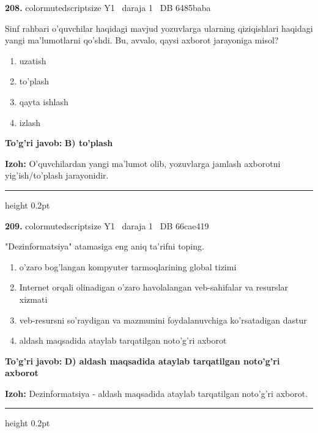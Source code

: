 \documentclass[10pt,a4paper,oneside]{article}
\begin{document}
\noindent\textbf{\color{ink}208.}  {color{muted}scriptsize Y1 \textbullet\ daraja 1 \textbullet\ DB 6485baba}
\par
Sinf rahbari o'quvchilar haqidagi mavjud yozuvlarga ularning qiziqishlari haqidagi yangi ma'lumotlarni qo'shdi. Bu, avvalo, qaysi axborot jarayoniga misol?
\begin{enumerate}[label=\Alph*),leftmargin=9mm]
\item uzatish
\item to'plash
\item qayta ishlash
\item izlash
\end{enumerate}
\begin{tcolorbox}[enhanced,breakable,colback=teal!4,colframe=teal!50!black,boxrule=0.5pt,arc=1.1mm,left=3mm,right=3mm,top=1.7mm,bottom=1.7mm,before skip=2mm,after skip=2mm]
\textbf{\color{teal}To'g'ri javob:} \textbf{B) to'plash}
\par\smallskip
\textbf{Izoh:} O'quvchilardan yangi ma'lumot olib, yozuvlarga jamlash axborotni yig'ish/to'plash jarayonidir.
\end{tcolorbox}
\vspace{2mm}\hrule height 0.2pt \vspace{3mm}

\noindent\textbf{\color{ink}209.}  {color{muted}scriptsize Y1 \textbullet\ daraja 1 \textbullet\ DB 66cae419}
\par
"Dezinformatsiya" atamasiga eng aniq ta'rifni toping.
\begin{enumerate}[label=\Alph*),leftmargin=9mm]
\item o'zaro bog'langan kompyuter tarmoqlarining global tizimi
\item Internet orqali olinadigan o'zaro havolalangan veb-sahifalar va resurslar xizmati
\item veb-resursni so'raydigan va mazmunini foydalanuvchiga ko'rsatadigan dastur
\item aldash maqsadida ataylab tarqatilgan noto'g'ri axborot
\end{enumerate}
\begin{tcolorbox}[enhanced,breakable,colback=teal!4,colframe=teal!50!black,boxrule=0.5pt,arc=1.1mm,left=3mm,right=3mm,top=1.7mm,bottom=1.7mm,before skip=2mm,after skip=2mm]
\textbf{\color{teal}To'g'ri javob:} \textbf{D) aldash maqsadida ataylab tarqatilgan noto'g'ri axborot}
\par\smallskip
\textbf{Izoh:} Dezinformatsiya - aldash maqsadida ataylab tarqatilgan noto'g'ri axborot.
\end{tcolorbox}
\vspace{2mm}\hrule height 0.2pt \vspace{3mm}
\end{document}
